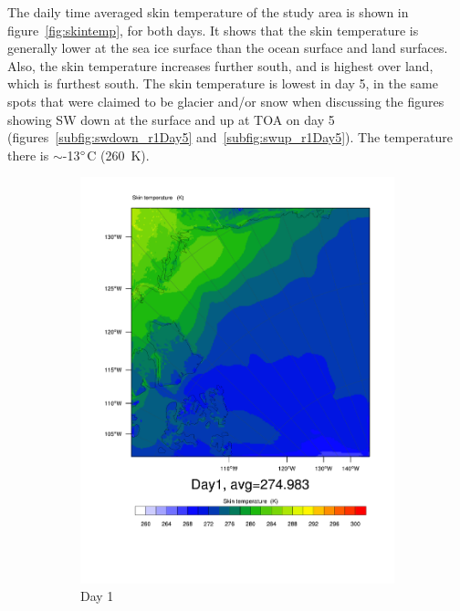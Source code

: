 The daily time averaged skin temperature of the study area is shown in figure~\ref{fig:skintemp}, for both days. It shows that the skin temperature is generally lower at the sea ice surface than the ocean surface and land surfaces. Also, the skin temperature increases further south, and is highest over land, which is furthest south. The skin temperature is lowest in day 5, in the same spots that were claimed to be glacier and/or snow when discussing the figures showing SW down at the surface and up at TOA on day 5 (figures~\ref{subfig:swdown_r1Day5} and~\ref{subfig:swup_r1Day5}). The temperature there is $\sim$-13$\degree$C (260~K).
\begin{figure}
	\begin{subfigure}{0.48\textwidth}
		\centering
		\includegraphics[width=\textwidth]{results/control/skintemp_day1.pdf}
		\caption{Day 1}
		\label{subfig:skin_r1Day1}
	\end{subfigure}
	\begin{subfigure}{0.48\textwidth}

\end{subfigure}
\end{figure}
